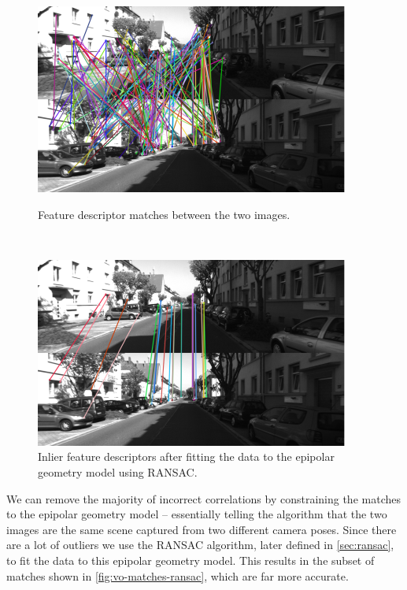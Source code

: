 \begin{figure}[h]
    \centering
    \captionsetup{format=plain}
    \begin{minipage}[t]{0.475\textwidth}
        \centering
        \includegraphics[width=\textwidth]{figures/vo_matches.pdf}
        \caption{Feature descriptor matches between the two images.}
        \label{fig:vo-matches}
    \end{minipage}\hfill%
    ~
    \begin{minipage}[t]{0.475\textwidth}
        \centering
        \includegraphics[width=\textwidth]{figures/vo_matches_ransac.pdf}
        \caption{Inlier feature descriptors after fitting the data to the epipolar geometry model using RANSAC.}
        \label{fig:vo-matches-ransac}
    \end{minipage}%
\end{figure}

We can remove the majority of incorrect correlations by constraining the matches to the epipolar geometry model \autocite{Hartley2004} – essentially telling the algorithm that the two images are the same scene captured from two different camera poses. Since there are a lot of outliers we use the RANSAC algorithm, later defined in \autoref{sec:ransac}, to fit the data to this epipolar geometry model. This results in the subset of matches shown in \autoref{fig:vo-matches-ransac}, which are far more accurate.

